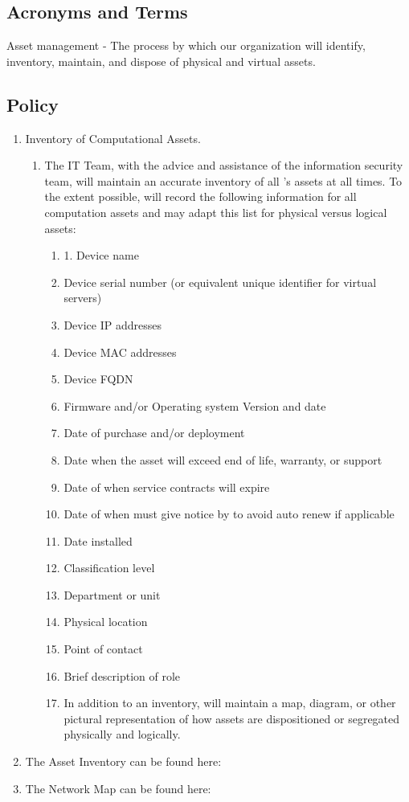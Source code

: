 \documentclass[../main.tex]{subfiles}
\begin{document}
\subsection{Acronyms and Terms}
Asset management - The process by which our organization will identify, inventory, maintain, and dispose of physical and virtual assets.
\subsection{Policy}
\begin{enumerate}
    \item Inventory of Computational Assets.
    \begin{enumerate}
        \item The IT Team, with the advice and assistance of the information security team, will maintain an accurate inventory of all \CompanyName's assets at all times.
        To the extent possible, \CompanyName{} will record the following information for all computation assets and may adapt this list for physical versus logical assets:
        \begin{enumerate}
            \item 1.	Device name
            \item Device serial number (or equivalent unique identifier for virtual servers)
            \item Device IP addresses
            \item Device MAC addresses
            \item Device FQDN
            \item Firmware and/or Operating system Version and date
            \item Date of purchase and/or deployment
            \item Date when the asset will exceed end of life, warranty, or support
            \item Date of when service contracts will expire
            \item Date of when \CompanyName{} must give notice by to avoid auto renew if applicable
            \item Date installed
            \item Classification level
            \item Department or unit
            \item Physical location
            \item Point of contact
            \item Brief description of role
            \item In addition to an inventory, \CompanyName{} will maintain a map, diagram, or other pictural representation of how assets are dispositioned or segregated physically and logically.
        \end{enumerate}
    \end{enumerate}
    \item The Asset Inventory can be found here: \AssetInventory
    \item The Network Map can be found here: \NetworkDiagram
\end{enumerate}
\end{document}
